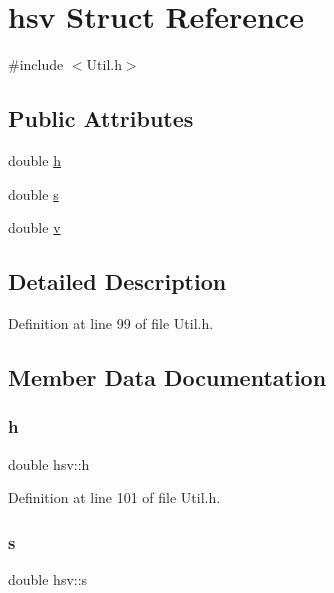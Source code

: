 \hypertarget{structhsv}{}\section{hsv Struct Reference}
\label{structhsv}


{\ttfamily \#include $<$Util.\+h$>$}

\subsection*{Public Attributes}
\begin{DoxyCompactItemize}
\item 
double \mbox{\hyperlink{structhsv_aa27eea5f2a89b941eead7139330d12f4}{h}}
\item 
double \mbox{\hyperlink{structhsv_a3cbdc4bf500068b5c4466c4272114a23}{s}}
\item 
double \mbox{\hyperlink{structhsv_a572c01d23590231adffe6f9b16df20d3}{v}}
\end{DoxyCompactItemize}


\subsection{Detailed Description}


Definition at line 99 of file Util.\+h.



\subsection{Member Data Documentation}
\mbox{\label{structhsv_aa27eea5f2a89b941eead7139330d12f4}} 
\subsubsection{\texorpdfstring{h}{h}}
{\footnotesize\ttfamily double hsv\+::h}



Definition at line 101 of file Util.\+h.

\mbox{\label{structhsv_a3cbdc4bf500068b5c4466c4272114a23}} 
\subsubsection{\texorpdfstring{s}{s}}
{\footnotesize\ttfamily double hsv\+::s}



